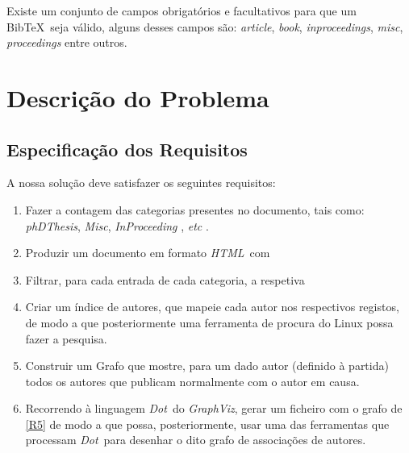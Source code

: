 \documentclass[11pt,a4paper]{report}
\begin{document}
Existe um conjunto de campos obrigatórios e facultativos para que um Bib\TeX \ seja válido, alguns desses campos são: \emph{article}, \emph{book}, \emph{inproceedings}, \emph{misc}, \emph{proceedings} entre outros.



\newpage

\section{Descrição do Problema}
\subsection{Especificação dos Requisitos }

\newcommand{\gv}{\emph{GraphViz}}
\newcommand{\htlm}{\emph{HTML}}
\newcommand{\dott}{\emph{Dot}}
\newcommand{\bib}{Bib\TeX}



A nossa solução deve satisfazer os seguintes requisitos: 
\begin{enumerate}[label=R\arabic*]
\item\label{R1} Fazer a contagem das categorias presentes no documento, tais como: \emph{phDThesis}, \emph{Misc}, \emph{InProceeding }, \emph{etc }.
\item\label{R2}Produzir um documento em formato \htlm \ com
\item\label{R3} Filtrar, para cada entrada de cada categoria, a respetiva

\item\label{R4} Criar um índice de autores, que mapeie cada autor nos respectivos registos, de modo a que posteriormente uma ferramenta de procura do Linux possa fazer a pesquisa.

\item\label{R5} Construir um Grafo que mostre, para um dado autor (definido à partida) todos os autores que publicam normalmente com o autor em causa.
\item\label{R6}Recorrendo à linguagem \dott \  do \gv, gerar um ficheiro com o grafo de \ref{R5} de modo a que possa, posteriormente, usar uma das ferramentas que processam \dott \  para desenhar o dito grafo de associações de autores.
\end{enumerate}
\end{document}
